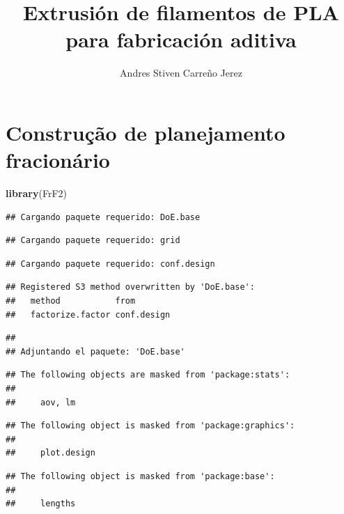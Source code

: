 \documentclass[
]{article}
\title{Extrusión de filamentos de PLA para fabricación aditiva}
\author{Andres Stiven Carreño Jerez}
\date{}
\newenvironment{Shaded}{\begin{snugshade}}{\end{snugshade}}
\newcommand{\FunctionTok}[1]{\textcolor[rgb]{0.13,0.29,0.53}{\textbf{#1}}}
\newcommand{\NormalTok}[1]{#1}
\begin{document}
\maketitle

\section{Construção de planejamento
fracionário}\label{construuxe7uxe3o-de-planejamento-fracionuxe1rio}

\begin{Shaded}
\begin{Highlighting}[]
\FunctionTok{library}\NormalTok{(FrF2)}
\end{Highlighting}
\end{Shaded}

\begin{verbatim}
## Cargando paquete requerido: DoE.base
\end{verbatim}

\begin{verbatim}
## Cargando paquete requerido: grid
\end{verbatim}

\begin{verbatim}
## Cargando paquete requerido: conf.design
\end{verbatim}

\begin{verbatim}
## Registered S3 method overwritten by 'DoE.base':
##   method           from       
##   factorize.factor conf.design
\end{verbatim}

\begin{verbatim}
## 
## Adjuntando el paquete: 'DoE.base'
\end{verbatim}

\begin{verbatim}
## The following objects are masked from 'package:stats':
## 
##     aov, lm
\end{verbatim}

\begin{verbatim}
## The following object is masked from 'package:graphics':
## 
##     plot.design
\end{verbatim}

\begin{verbatim}
## The following object is masked from 'package:base':
## 
##     lengths
\end{verbatim}
\end{document}
